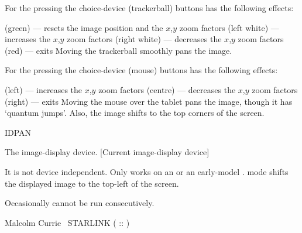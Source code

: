 {\begin{manroutinedescription}
  For the {} pressing the choice-device (trackerball) buttons has
  the following effects:
\begin{mandescription}
 (green) --- resets the image position and the {$x$},{$y$}
  zoom factors
 (left white) --- increases the {$x$},{$y$} zoom factors
 (right white) --- decreases the {$x$},{$y$} zoom factors
 (red) --- exits
  Moving the trackerball smoothly pans the image.

\end{mandescription}
  For the {} pressing the choice-device (mouse) buttons has the
  following effects:
\begin{mandescription}
 (left) --- increases the {$x$},{$y$} zoom factors
 (centre) --- decreases the {$x$},{$y$} zoom factors
 (right) --- exits
  Moving the mouse over the tablet pans the image, though it has
  `quantum jumps'. Also, the image shifts to the top corners of
  the screen.

\end{mandescription}
  IDPAN

\begin{manparametertable}
  The image-display device.
  {\mantt [}Current image-display device{\mantt ]}
\end{manparametertable}
  It is not device independent. Only works on an {} or an
  early-model {}. {} mode shifts the displayed
  image to the top-left of the screen.

  Occasionally cannot be run consecutively.

  Malcolm Currie ~STARLINK ( {}::{} )
\end{manroutinedescription}

 
}
